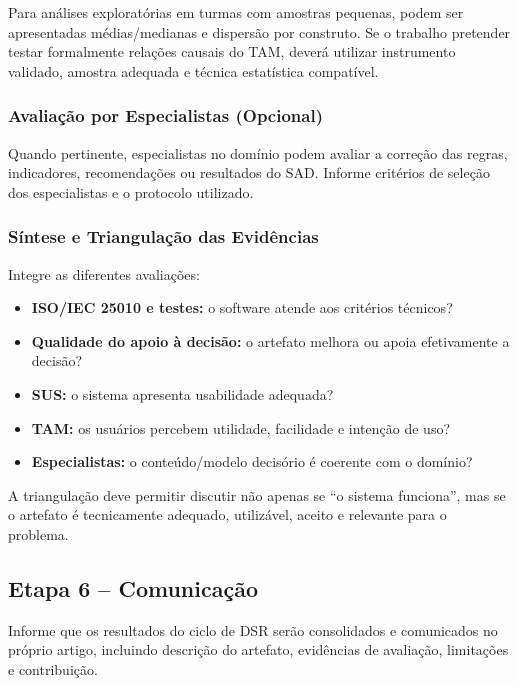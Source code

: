 \documentclass[12pt]{article}
\begin{document}
Para análises exploratórias em turmas com amostras pequenas, podem ser apresentadas médias/medianas e dispersão por construto. Se o trabalho pretender testar formalmente relações causais do TAM, deverá utilizar instrumento validado, amostra adequada e técnica estatística compatível.

\subsubsection{Avaliação por Especialistas (Opcional)}

Quando pertinente, especialistas no domínio podem avaliar a correção das regras, indicadores, recomendações ou resultados do SAD. Informe critérios de seleção dos especialistas e o protocolo utilizado.

\subsubsection{Síntese e Triangulação das Evidências}

Integre as diferentes avaliações:
\begin{itemize}[noitemsep]
    \item \textbf{ISO/IEC 25010 e testes:} o software atende aos critérios técnicos?
    \item \textbf{Qualidade do apoio à decisão:} o artefato melhora ou apoia efetivamente a decisão?
    \item \textbf{SUS:} o sistema apresenta usabilidade adequada?
    \item \textbf{TAM:} os usuários percebem utilidade, facilidade e intenção de uso?
    \item \textbf{Especialistas:} o conteúdo/modelo decisório é coerente com o domínio?
\end{itemize}

A triangulação deve permitir discutir não apenas se ``o sistema funciona'', mas se o artefato é tecnicamente adequado, utilizável, aceito e relevante para o problema.

\subsection{Etapa 6 -- Comunicação}

Informe que os resultados do ciclo de DSR serão consolidados e comunicados no próprio artigo, incluindo descrição do artefato, evidências de avaliação, limitações e contribuição.

\end{document}
